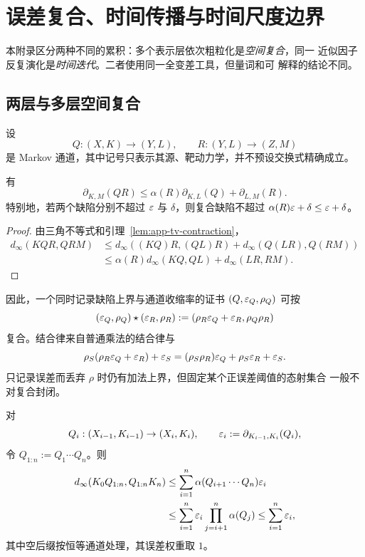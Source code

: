 \section{误差复合、时间传播与时间尺度边界}
\label{app:composition-time}

本附录区分两种不同的累积：多个表示层依次粗粒化是\emph{空间复合}，同一
近似因子反复演化是\emph{时间迭代}。二者使用同一全变差工具，但量词和可
解释的结论不同。

\subsection{两层与多层空间复合}

设
\[
 Q:(X,K)\longrightarrow(Y,L),
 \qquad
 R:(Y,L)\longrightarrow(Z,M)
\]
是 Markov 通道，其中记号只表示其源、靶动力学，并不预设交换式精确成立。

\begin{theorem}[近似动力学因子的复合]
\label{thm:app-factor-composition}
有
\begin{equation}
 \partial_{K,M}(QR)
 \le
 \alpha(R)\partial_{K,L}(Q)+\partial_{L,M}(R).
 \label{eq:app-two-layer-composition}
\end{equation}
特别地，若两个缺陷分别不超过 $\varepsilon$ 与 $\delta$，则复合缺陷不超过
$\alpha(R)\varepsilon+\delta\le\varepsilon+\delta$。
\end{theorem}

\begin{proof}
由三角不等式和引理~\ref{lem:app-tv-contraction}，
\begin{align*}
 d_\infty(KQR,QRM)
 &\le d_\infty((KQ)R,(QL)R)
      +d_\infty(Q(LR),Q(RM))\\
 &\le \alpha(R)d_\infty(KQ,QL)+d_\infty(LR,RM).
\end{align*}
\end{proof}

因此，一个同时记录缺陷上界与通道收缩率的证书
$(Q,\varepsilon_Q,\rho_Q)$ 可按
\begin{equation}
 (\varepsilon_Q,\rho_Q)\star(\varepsilon_R,\rho_R)
 :=(\rho_R\varepsilon_Q+\varepsilon_R,\rho_Q\rho_R)
 \label{eq:app-certificate-composition}
\end{equation}
复合。结合律来自普通乘法的结合律与
\[
 \rho_S(\rho_R\varepsilon_Q+\varepsilon_R)+\varepsilon_S
 =(\rho_S\rho_R)\varepsilon_Q+\rho_S\varepsilon_R+\varepsilon_S.
\]
只记录误差而丢弃 $\rho$ 时仍有加法上界，但固定某个正误差阈值的态射集合
一般不对复合封闭。

\begin{corollary}[多层空间误差]
\label{cor:app-multilayer-composition}
对
\[
 Q_i:(X_{i-1},K_{i-1})\to(X_i,K_i),
 \qquad
 \varepsilon_i:=\partial_{K_{i-1},K_i}(Q_i),
\]
令 $Q_{1:n}:=Q_1\cdots Q_n$。则
\begin{align}
 d_\infty(K_0Q_{1:n},Q_{1:n}K_n)
 &\le\sum_{i=1}^n
 \alpha(Q_{i+1}\cdots Q_n)\varepsilon_i
 \label{eq:app-multilayer-exact-alpha}\\
 &\le\sum_{i=1}^n\varepsilon_i
       \prod_{j=i+1}^n\alpha(Q_j)
 \le\sum_{i=1}^n\varepsilon_i,
 \label{eq:app-multilayer-product-alpha}
\end{align}
其中空后缀按恒等通道处理，其误差权重取 $1$。
\end{corollary}

